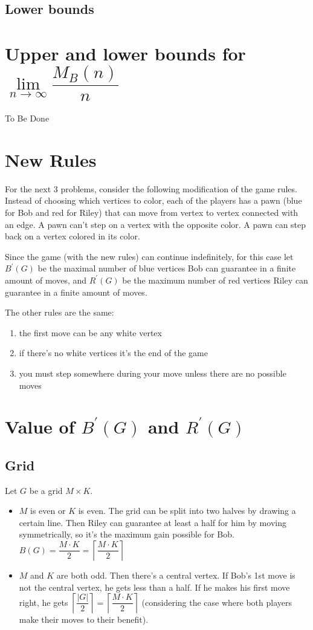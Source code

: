 \documentclass[12pt,a4paper, flushleft]{article}
\newcommand{\p}[1]{#1^{\prime}}
\newcommand{\ceil}[1]{\left\lceil #1 \right\rceil}
\begin{document}
\subsection{Lower bounds}
\section{Upper and lower bounds for $\lim\limits_{n\to\infty}\dfrac{M_B(n)}{n}$} To Be Done
\section*{New Rules}
For the next 3 problems, consider the following modification of the game rules. Instead of
choosing which vertices to color, each of the players has a pawn (blue for Bob and red for Riley)
that can move from vertex to vertex connected with an edge. A pawn can't step on a vertex with the opposite color. A pawn can step back on a vertex colored in its color.

Since the game (with the new rules) can continue indefinitely, for this case let $\p B (G)$ be the
maximal number of blue vertices Bob can guarantee in a finite amount of moves, and $\p R (G)$ be
the maximum number of red vertices Riley can guarantee in a finite amount of moves.

The other rules are the same:
\begin{enumerate}
	\item the first move can be any white vertex
	\item if there's no white vertices it's the end of the game
	\item you must step somewhere during your move unless there are no possible moves
\end{enumerate}	
\section{Value of $\p B(G) $ and $\p R(G)$}
\subsection{Grid}
Let $G$ be a grid $M\times K$.

\begin{itemize}
	\item $M$ is even or $K$ is even. The grid can be split into two halves by drawing a certain line. Then Riley can guarantee at least a half for him by moving symmetrically, so it's the maximum gain possible for Bob. $B(G) = \dfrac{M\cdot K}{2} = \ceil{\dfrac{M\cdot K}{2}}$
	\item $M$ and $K$ are both odd. Then there's a central vertex. If Bob's 1st move is not the central vertex, he gets less than a half. If he makes his first move right, he gets $\ceil{\dfrac{|G|}{2}} = \ceil{\dfrac{M\cdot K}{2}}$ (considering the case where both players make their moves to their benefit).
\end{itemize}
\end{document}
